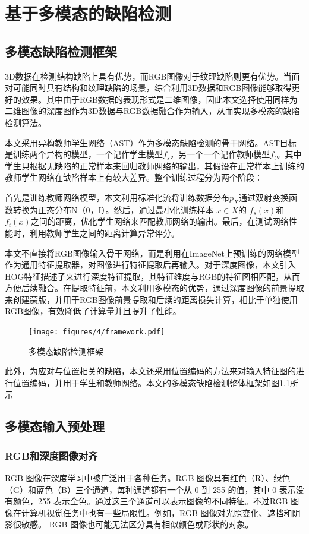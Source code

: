 \chapter{基于多模态的缺陷检测}

\section{多模态缺陷检测框架}
3D数据在检测结构缺陷上具有优势，而RGB图像对于纹理缺陷则更有优势。当面对可能同时具有结构和纹理缺陷的场景，综合利用3D数据和RGB图像能够取得更好的效果。其中由于RGB数据的表现形式是二维图像，因此本文选择使用同样为二维图像的深度图作为3D数据与RGB数据融合作为输入，从而实现多模态的缺陷检测算法。

本文采用异构教师学生网络（AST）\cite{rudolphAsymmetricStudentTeacherNetworks2022}作为多模态缺陷检测的骨干网络。AST目标是训练两个异构的模型，一个记作学生模型$f_{s}$，另一个一个记作教师模型$f_{t}$。其中学生只根据无缺陷的正常样本来回归教师网络的输出，其假设在正常样本上训练的教师学生网络在缺陷样本上有较大差异。整个训练过程分为两个阶段：

首先是训练教师网络模型，本文利用标准化流将训练数据分布$p_{X}$通过双射变换函数转换为正态分布N（0，I）。然后，通过最小化训练样本 $x \in X$的 $f_{s}(x)$和$f_{t}(x)$之间的距离，优化学生网络来匹配教师网络的输出。最后，在测试网络性能时，利用教师学生之间的距离计算异常评分。

本文不直接将RGB图像输入骨干网络，而是利用在ImageNet上预训练的网络模型作为通用特征提取器，对图像进行特征提取后再输入。对于深度图像，本文引入HOG特征描述子来进行深度特征提取，其特征维度与RGB的特征图相匹配，从而方便后续融合。在提取特征前，本文利用多模态的优势，通过深度图像的前景提取来创建蒙版，并用于RGB图像前景提取和后续的距离损失计算，相比于单独使用RGB图像，有效降低了计算量并且提升了性能。
\begin{figure}[htbp]
    \centering
    \texttt{[image: figures/4/framework.pdf]}
    \caption{多模态缺陷检测框架}
    \label{fig:4-framework}
\end{figure}

此外，为应对与位置相关的缺陷，本文还采用位置编码的方法来对输入特征图的进行位置编码，并用于学生和教师网络。本文的多模态缺陷检测整体框架如图\ref{fig:4-framework}所示



\section{多模态输入预处理}
\subsection{RGB和深度图像对齐}
RGB 图像在深度学习中被广泛用于各种任务。RGB 图像具有红色（R）、绿色（G）和蓝色（B）三个通道，每种通道都有一个从 0 到 255 的值，其中 0 表示没有颜色，255 表示全色。通过这三个通道可以表示图像的不同特征。不过RGB 图像在计算机视觉任务中也有一些局限性。例如，RGB 图像对光照变化、遮挡和阴影很敏感。 RGB 图像也可能无法区分具有相似颜色或形状的对象。

